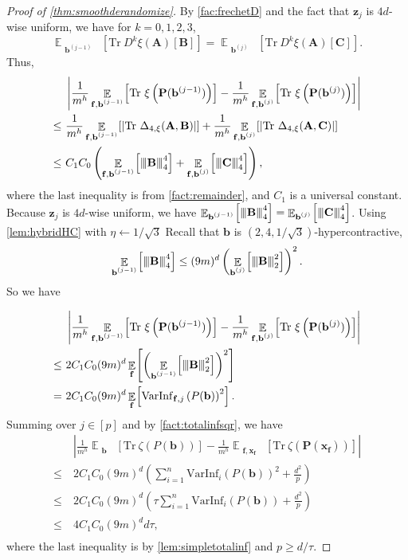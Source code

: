 \documentclass[10pt,a4paper]{article}
\theoremstyle{plain}
\theoremstyle{definition}
\newcommand {\minusspace} {\: \! \!}
\newcommand {\Fn} [2] {\ensuremath{ #1 \minusspace \Br{ #2 } }}
\newcommand {\br} [1] {\ensuremath{ \left( #1 \right) }}
\newcommand {\Br} [1] {\ensuremath{ \left[ #1 \right] }}
\newcommand {\ab} [1] {\ensuremath{ \left| #1 \right| }}
\DeclareMathOperator*{\bigE}{\mathbb{E}}
\newcommand {\expec} [2] {\Fn{\bigE_{\substack{#1}}}{#2}}
\newcommand{\nnorm}[1]{{\left\vert\kern-0.25ex\left\vert\kern-0.25ex\left\vert #1
		\right\vert\kern-0.25ex\right\vert\kern-0.25ex\right\vert}}
\newcommand {\Tr} {\ensuremath{ \mathrm{Tr} }}
\newcommand{\randP}{\ensuremath{\mathbf{P}}}
\newcommand{\randb}{\ensuremath{\mathbf{b}}}
\newcommand{\randz}{\ensuremath{\mathbf{z}}}
\newcommand{\randx}{\ensuremath{\mathbf{x}}}
\newcommand{\randf}{\ensuremath{\mathbf{f}}}
\newcommand{\randA}{\ensuremath{\mathbf{A}}}
\newcommand{\randB}{\ensuremath{\mathbf{B}}}
\newcommand{\randC}{\ensuremath{\mathbf{C}}}
\newcommand{\varinfi}[1]{\ensuremath{\mathrm{VarInf}_i}\br{#1}}
\newcommand{\infrfj}[1]{\ensuremath{\mathrm{VarInf}_{\randf,j}}\br{#1}}
\newcommand{\1}{\mathbb{1}} %
\begin{document}
\begin{proof}[Proof of \cref{thm:smoothderandomize}]
By \cref{fac:frechetD} and the fact that $\randz_j$ is $4d$-wise uniform, we have for $k=0,1,2,3$, 
\[\expec{\randb^{(j-1)}}{\Tr~D^k\xi(\randA)\Br{\randB}}=\expec{\randb^{(j)}}{\Tr~D^k\xi(\randA)\Br{\randC}}.\]
Thus, 
\begin{align*}
&\ab{\frac{1}{m^h}\expec{\randf,\randb^{(j-1)}}{\Tr~\xi\br{\randP(\randb^{(j-1)})}}-\frac{1}{m^h}\expec{\randf,\randb^{(j)}}{\Tr~\xi\br{\randP(\randb^{(j)})}}}\\
\leq~&\frac{1}{m^h}\expec{\randf,\randb^{(j-1)}}{\ab{\Tr~\Delta_{4,\xi}(\randA,\randB)}}+\frac{1}{m^h}\expec{\randf,\randb^{(j)}}{\ab{\Tr~\Delta_{4,\xi}(\randA,\randC)}}\\
\leq~&C_1C_0\br{\expec{\randf,\randb^{(j-1)}}{\nnorm{\randB}_4^4}+\expec{\randf,\randb^{(j)}}{\nnorm{\randC}_4^4}},
\end{align*}
where the last inequality is from \cref{fact:remainder}, and $C_1$ is a universal constant. Because $\randz_j$ is $4d$-wise uniform, we have $\expec{\randb^{(j-1)}}{\nnorm{\randB}_4^4}=\expec{\randb^{(j)}}{\nnorm{\randC}_4^4}$. Using \cref{lem:hybridHC} with $\eta\gets1/\sqrt{3}$ Recall that $\randb$ is $(2,4,1/\sqrt{3})$-hypercontractive, \[\expec{\randb^{(j-1)}}{\nnorm{\randB}_4^4}\leq(9m)^d\br{\expec{\randb^{(j)}}{\nnorm{\randB}_2^2}}^2.\]
So we have 

\begin{align*}
&\ab{\frac{1}{m^h}\expec{\randf,\randb^{(j-1)}}{\Tr~\xi\br{\randP(\randb^{(j-1)})}}-\frac{1}{m^h}\expec{\randf,\randb^{(j)}}{\Tr~\xi\br{\randP(\randb^{(j)})}}}\\
\leq~&2C_1C_0(9m)^d\expec{\randf}{\br{\expec{\randb^{(j-1)}}{\nnorm{\randB}_2^2}}^2}\\
=~&2C_1C_0(9m)^d\expec{\randf}{\infrfj{P(\randb)}^2}.
\end{align*}
Summing over $j\in[p]$ and by \cref{fact:totalinfsqr}, we have
\begin{align*}
&\ab{\frac{1}{m^h}\expec{\randb}{\Tr~\zeta\br{P(\randb)}}-\frac{1}{m^h}\expec{\randf,\randx_\randf}{\Tr~\zeta\br{\randP(\randx_\randf)}}}\\\leq~&2C_1C_0(9m)^d\br{\sum_{i=1}^n\varinfi{P(\randb)}^2+\frac{d^2}{p}}\\
\leq~&2C_1C_0(9m)^d\br{\tau\sum_{i=1}^n\varinfi{P(\randb)}+\frac{d^2}{p}}\\
\leq~&4C_1C_0(9m)^dd\tau,\\
\end{align*}
where the last inequality is by \cref{lem:simpletotalinf} and $p\ge d/\tau$.
\end{proof}
\end{document}
